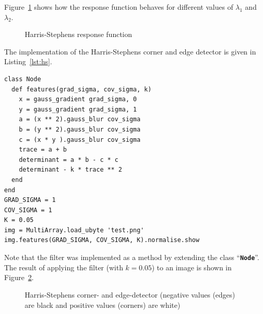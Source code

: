\documentclass[12pt,a4paper,oneside,openright]{book}
\newcommand{\fig}[1]{Figure~\ref{fig:#1}}
\newcommand{\lst}[1]{Listing~\ref{lst:#1}}
\newcommand{\code}[1]{``\texttt{\textbf{\textcolor{codegray}{\small{#1}}}}''}
\begin{document}
\begin{CJK}{UTF8}{}
\fig{harris} shows how the response function behaves for different values of $\lambda_1$ and $\lambda_2$.
\begin{figure}[htbp]
  \begin{center}
    \caption{Harris-Stephens response function\label{fig:harris}}
  \end{center}
\end{figure}
The implementation of the Harris-Stephens corner and edge detector is given in \lst{hs}.
\lstset{language=Ruby,frame=single,numbers=none}
\begin{lstlisting}[float,caption={Harris-Stephens corner and edge detector},escapechar=\$,label=lst:hs]
class Node
  def features(grad_sigma, cov_sigma, k)
    x = gauss_gradient grad_sigma, 0
    y = gauss_gradient grad_sigma, 1
    a = (x ** 2).gauss_blur cov_sigma
    b = (y ** 2).gauss_blur cov_sigma
    c = (x * y ).gauss_blur cov_sigma
    trace = a + b
    determinant = a * b - c * c
    determinant - k * trace ** 2
  end
end
GRAD_SIGMA = 1
COV_SIGMA = 1
K = 0.05
img = MultiArray.load_ubyte 'test.png'
img.features(GRAD_SIGMA, COV_SIGMA, K).normalise.show
\end{lstlisting}
Note that the filter was implemented as a method by extending the class \code{Node}. The result of applying the filter (with $k=0.05$) to an image is shown in \fig{hs}.
\begin{figure}[htbp]
   \begin{center}
     \begin{minipage}[c]{.45\textwidth}
     \end{minipage}
     \begin{minipage}[c]{.45\textwidth}
       \resizebox{\textwidth}{!}{\texttt{[image: h\_s]}}
     \end{minipage}
     \caption{Harris-Stephens corner- and edge-detector (negative values
       (edges) are black and positive values (corners) are white)\label{fig:hs}}
   \end{center}
\end{figure}


\end{CJK}
\end{document}
